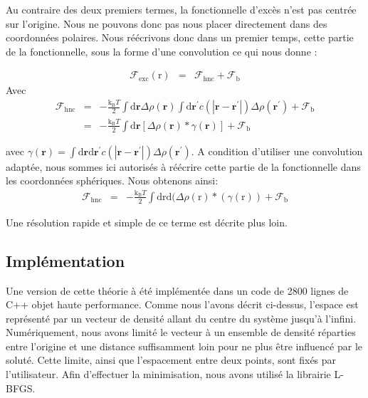 Au contraire des deux premiers termes, la fonctionnelle d'excès n'est pas centrée sur l'origine. Nous ne pouvons donc pas nous placer directement dans des coordonnées polaires. Nous réécrivons donc dans un premier temps, cette partie de la fonctionnelle, sous la forme d'une convolution ce qui nous donne :

\begin{eqnarray}
\mathcal{F}_\mathrm{exc}(\mathrm{r}) &=& \mathcal{F}_\mathrm{hnc} + \mathcal{F}_\mathrm{b}
\end{eqnarray}
Avec
\begin{eqnarray}
\mathcal{F}_\mathrm{hnc}&=& -\frac{\mathrm{k_B}T}{2}\int\mathrm{d}\boldsymbol{r} \Delta\rho\left( \boldsymbol{r} \right)  \int\mathrm{d}\boldsymbol{r}^\prime c\left( \left|\boldsymbol{r}-\boldsymbol{r}^\prime\right| \right) \Delta\rho\left( \boldsymbol{r}^\prime \right) + \mathcal{F}_\mathrm{b}\\
						 &=& -\frac{\mathrm{k_B}T}{2}\int\mathrm{d}\boldsymbol{r} [ \Delta\rho\left( \boldsymbol{r} \right)  *\gamma( \boldsymbol{r} ) ] + \mathcal{F}_\mathrm{b}
\end{eqnarray}

 avec $\gamma(\boldsymbol{r}) = \int\mathrm{d}\boldsymbol{r}\mathrm{d}\boldsymbol{r}^\prime c\left( \left|\boldsymbol{r}-\boldsymbol{r}^\prime\right| \right) \Delta\rho\left( \boldsymbol{r}^\prime  \right)$. A condition d'utiliser une convolution adaptée, nous sommes ici autorisés à réécrire cette partie de la fonctionnelle dans les coordonnées sphériques. Nous obtenons ainsi:
\begin{eqnarray}
\mathcal{F}_\mathrm{hnc} &=& -\frac{\mathrm{k_B}T}{2} \int \mathrm{d} \mathrm{r} \mathrm{d} ( \Delta\rho\left( \mathrm{r} \right)  \ast ( \gamma(\mathrm{r})  ) + \mathcal{F}_\mathrm{b}
\end{eqnarray}

Une résolution rapide et simple de ce terme est décrite plus loin.




\subsection{Implémentation}
Une version de cette théorie à été implémentée dans un code de 2800 lignes de C++ objet haute performance. Comme nous l'avons décrit ci-dessus, l'espace est représenté par un vecteur de densité allant du centre du système jusqu'à l'infini. Numériquement, nous avons limité le vecteur à un ensemble de densité réparties entre l'origine et une distance suffisamment loin pour ne plus être influencé par le soluté. Cette limite, ainsi que l'espacement entre deux points, sont fixés par l'utilisateur.
Afin d'effectuer la minimisation, nous avons utilisé la librairie L-BFGS\cite{zhu_algorithm_1997}.

